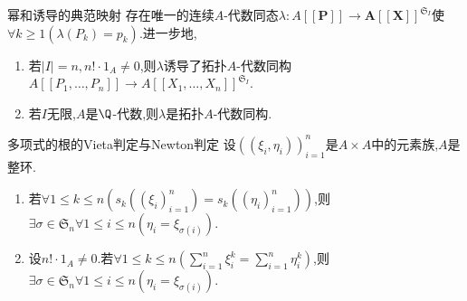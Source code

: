 \begin{proposition}{幂和诱导的典范映射}{}
	存在唯一的连续$A$-代数同态$\lambda:A[[\mathbf{P}]]\to\mathbf{A[[\mathbf{X}]]}^{\mathfrak{S}_{I}}$使$\forall k\geq 1\left(\lambda\left(P_{k}\right)=p_{k}\right)$.进一步地,
	\begin{enumerate}
		\item 若$\left|I\right|=n,n!\cdot 1_{A}\neq 0$,则$\lambda$诱导了拓扑$A$-代数同构$A[[P_{1},\ldots,P_{n}]]\to A[[X_{1},\ldots,X_{n}]]^{\mathfrak{S}_{I}}$.
		\item 若$I$无限,$A$是$\Q$-代数,则$\lambda$是拓扑$A$-代数同构.
	\end{enumerate}
\end{proposition}

\begin{corollary}{多项式的根的Vieta判定与Newton判定}{}
	设$\left(\left(\xi_{i},\eta_{i}\right)\right)_{i=1}^{n}$是$A\times A$中的元素族,$A$是整环.
	\begin{enumerate}
		\item 若$\forall 1\leq k\leq n\left(s_{k}\left(\left(\xi_{i}\right)_{i=1}^{n}\right)=s_{k}\left(\left(\eta_{i}\right)_{i=1}^{n}\right)\right)$,则$\exists\sigma\in\mathfrak{S}_{n}\forall 1\leq i\leq n\left(\eta_{i}=\xi_{\sigma\left(i\right)}\right)$.
		\item 设$n!\cdot 1_{A}\neq 0$.若$\forall 1\leq k\leq n\left(\sum\limits_{i=1}^{n}\xi_{i}^{k}=\sum\limits_{i=1}^{n}\eta_{i}^{k}\right)$,则$\exists\sigma\in\mathfrak{S}_{n}\forall 1\leq i\leq n\left(\eta_{i}=\xi_{\sigma\left(i\right)}\right)$.
	\end{enumerate}
\end{corollary}



